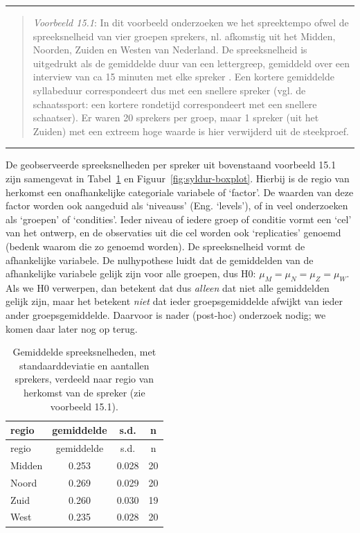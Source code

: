 \documentclass[
]{book}
\begin{document}
\begin{center}\rule{0.5\linewidth}{0.5pt}\end{center}

\begin{quote}
\emph{Voorbeeld 15.1}: In dit voorbeeld
onderzoeken we het spreektempo ofwel de spreeksnelheid van vier groepen
sprekers, nl. afkomstig uit het Midden, Noorden, Zuiden en Westen van
Nederland. De spreeksnelheid is uitgedrukt als de gemiddelde duur van
een lettergreep, gemiddeld over een interview van ca 15 minuten met elke
spreker \citep{Quene08} \citep{R-hqmisc}. Een kortere gemiddelde syllabeduur
correspondeert
dus met een snellere spreker (vgl. de schaatssport: een kortere
rondetijd correspondeert met een snellere schaatser). Er waren 20
sprekers per groep, maar 1 spreker (uit het Zuiden) met een extreem hoge
waarde is hier verwijderd uit de steekproef.
\end{quote}

\begin{center}\rule{0.5\linewidth}{0.5pt}\end{center}

De geobserveerde spreeksnelheden per spreker uit bovenstaand voorbeeld 15.1
zijn samengevat in Tabel~\ref{tab:syldur} en
Figuur~\ref{fig:syldur-boxplot}. Hierbij is de regio van herkomst een
onafhankelijke categoriale variabele of `factor'. De waarden van deze
factor worden ook aangeduid als `niveaus\textquotesingle s' (Eng. `levels'), of in veel
onderzoeken als `groepen' of `condities'. Ieder niveau of iedere groep of
conditie vormt een `cel' van het ontwerp, en de observaties uit die cel
worden ook `replicaties' genoemd (bedenk waarom die zo genoemd worden).
De spreeksnelheid vormt de afhankelijke variabele. De nulhypothese luidt
dat de gemiddelden van de afhankelijke variabele gelijk zijn voor alle
groepen, dus H0: \(\mu_M = \mu_N = \mu_Z = \mu_W\). Als we H0 verwerpen,
dan betekent dat dus \emph{alleen} dat niet alle gemiddelden gelijk zijn,
maar het betekent \emph{niet} dat ieder groepsgemiddelde afwijkt van ieder
ander groepsgemiddelde. Daarvoor is nader (post-hoc) onderzoek nodig; we
komen daar later nog op terug.

\begin{longtable}[]{@{}lccc@{}}
\caption{\label{tab:syldur} Gemiddelde spreeksnelheden, met standaarddeviatie en aantallen sprekers, verdeeld naar regio van herkomst van de spreker (zie voorbeeld 15.1).}\tabularnewline
\toprule\noalign{}
regio & gemiddelde & s.d. & n \\
\midrule\noalign{}
\endfirsthead
\toprule\noalign{}
regio & gemiddelde & s.d. & n \\
\midrule\noalign{}
\endhead
\bottomrule\noalign{}
\endlastfoot
Midden & 0.253 & 0.028 & 20 \\
Noord & 0.269 & 0.029 & 20 \\
Zuid & 0.260 & 0.030 & 19 \\
West & 0.235 & 0.028 & 20 \\
\end{longtable}
\end{document}
